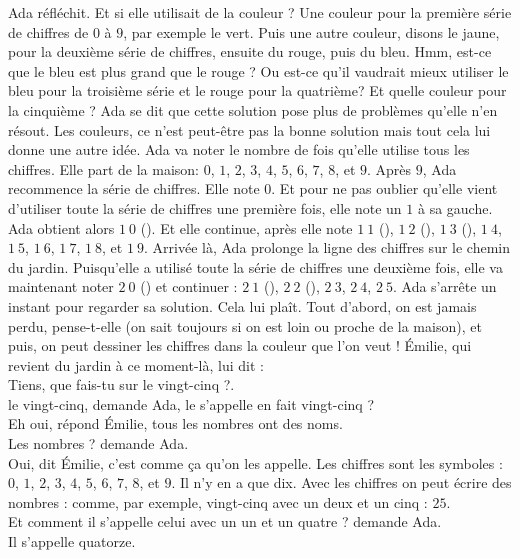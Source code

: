 Ada réfléchit. Et si elle utilisait de la couleur ? 
Une couleur pour la première série de chiffres de $0$ à $9$, par exemple le vert. Puis une autre couleur, disons le jaune, pour la deuxième série de chiffres, ensuite du rouge, puis du bleu. Hmm, est-ce que le bleu est plus grand que le rouge ? Ou est-ce qu’il vaudrait mieux utiliser le bleu pour la troisième série et le rouge pour la quatrième? Et quelle couleur pour la cinquième ? Ada se dit que cette solution pose plus de problèmes qu’elle n’en résout.  
Les couleurs, ce n’est peut-être pas la bonne solution mais tout cela lui donne une autre idée. Ada va noter le nombre de fois qu’elle utilise tous les chiffres. Elle part de la maison: $0$, $1$, $2$, $3$, $4$, $5$, $6$, $7$, $8$, et $9$. Après $9$, Ada recommence la série de chiffres. Elle note $0$. Et pour ne pas oublier qu’elle vient d’utiliser toute la série de chiffres une première fois, elle note un $1$ à sa gauche. Ada obtient alors $1~0$ (). Et elle continue, après elle note $1~1$ (), $1~2$ (), $1~3$ (), $1~4$, $1~5$, $1~6$, $1~7$, $1~8$, et $1~9$. 
Arrivée là, Ada prolonge la ligne des chiffres sur le chemin du jardin. 
Puisqu’elle a utilisé toute la série de chiffres une deuxième fois, elle va maintenant noter $2~0$ () et continuer : $2~1$ (), $2~2$ (), $2~3$, $2~4$, $2~5$. 
Ada s'arrête un instant pour regarder sa solution. Cela lui plaît. Tout d’abord, on est jamais perdu, pense-t-elle (on sait toujours si on est loin ou proche de la maison), et puis, on peut dessiner les chiffres dans la couleur que l’on veut ! 
Émilie, qui revient du jardin à ce moment-là, lui dit :\\
\guillemotleft Tiens, que fais-tu sur le vingt-cinq ?. \\
\mdash le vingt-cinq, demande Ada, le  s’appelle en fait vingt-cinq ?\\
\mdash Eh oui, répond Émilie, tous les nombres ont des noms.\\
\mdash Les nombres ? demande Ada.\\
\mdash Oui, dit Émilie, c’est comme ça qu'on les appelle. Les chiffres sont les symboles : $0$, $1$, $2$, $3$, $4$, $5$, $6$, $7$, $8$, et $9$. Il n’y en a que dix. Avec les chiffres on peut écrire des nombres : comme, par exemple, vingt-cinq avec un deux et un cinq : $25$.\\
\mdash Et comment il s’appelle celui avec un un et un quatre ? demande Ada.\\
\mdash Il s'appelle quatorze.\\
